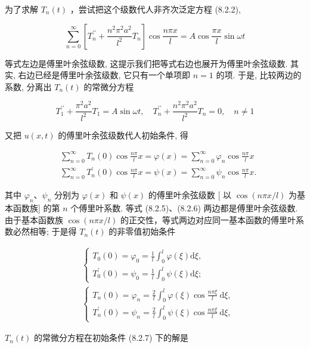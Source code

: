 为了求解 $T_{n}(t)$ ，尝试把这个级数代人非齐次泛定方程 (8.2.2),

$$
\sum_{n=0}^{\infty}\left[T_{n}^{\prime \prime}+\frac{n^{2} \pi^{2} a^{2}}{l^{2}} T_{n}\right] \cos \frac{n \pi x}{l}=A \cos \frac{\pi x}{l} \sin \omega t
$$

等式左边是傅里叶余弦级数, 这提示我们把等式右边也展开为傅里叶余弦级数. 其实, 右边已经是傅里叶余弦级数, 它只有一个单项即 $n=1$ 的项. 于是, 比较两边的系数, 分离出 $T_{n}(t)$ 的常微分方程

$$
T_{1}^{\prime \prime}+\frac{\pi^{2} a^{2}}{l^{2}} T_{1}=A \sin \omega t, \quad T_{n}^{\prime \prime}+\frac{n^{2} \pi^{2} a^{2}}{l^{2}} T_{n}=0, \quad n \neq 1
$$

又把 $u(x, t)$ 的傅里叶余弦级数代人初始条件, 得

$$
\begin{aligned}
& \sum_{n=0}^{\infty} T_{n}(0) \cos \frac{n \pi}{l} x=\varphi(x)=\sum_{n=0}^{\infty} \varphi_{n} \cos \frac{n \pi}{l} x \\
& \sum_{n=0}^{\infty} T_{n}^{\prime}(0) \cos \frac{n \pi}{l} x=\psi(x)=\sum_{n=0}^{\infty} \psi_{n} \cos \frac{n \pi}{l} x .
\end{aligned}
$$

其中 $\varphi_{n} 、 \psi_{n}$ 分别为 $\varphi(x)$ 和 $\psi(x)$ 的傅里叶余弦级数 [ 以 $\cos (n \pi x / l)$ 为基本函数族] 的第 $n$ 个傅里叶系数. 等式 (8.2.5)、(8.2.6) 两边都是傅里叶余弦级数. 由于基本函数族 $\cos (n \pi x / l)$ 的正交性，等式两边对应同一基本函数的傅里叶系数必然相等; 于是得 $T_{n}(t)$ 的非零值初始条件

$$
\begin{aligned}
& \left\{\begin{array}{l}
T_{0}(0)=\varphi_{0}=\frac{1}{l} \int_{0}^{l} \varphi(\xi) \mathrm{d} \xi, \\
T_{0}^{\prime}(0)=\psi_{0}=\frac{1}{l} \int_{0}^{l} \psi(\xi) \mathrm{d} \xi ;
\end{array}\right. \\
& \left\{\begin{array}{l}
T_{n}(0)=\varphi_{n}=\frac{2}{l} \int_{0}^{l} \varphi(\xi) \cos \frac{n \pi \xi}{l} \mathrm{~d} \xi, \\
T_{n}^{\prime}(0)=\psi_{n}=\frac{2}{l} \int_{0}^{l} \psi(\xi) \cos \frac{n \pi \xi}{l} \mathrm{~d} \xi,
\end{array}\right.
\end{aligned}
$$

$T_{n}(t)$ 的常微分方程在初始条件 (8.2.7) 下的解是


